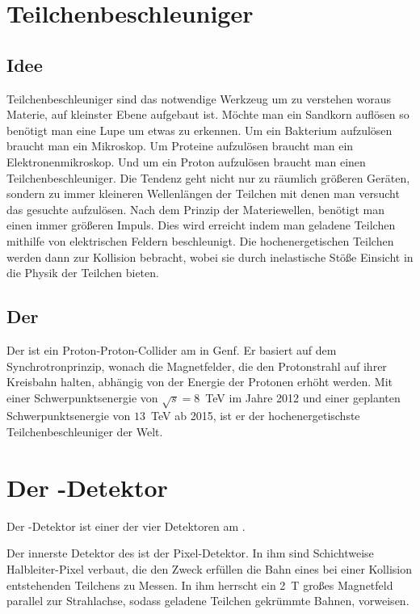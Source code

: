 \section{Teilchenbeschleuniger}
\subsection{Idee}
Teilchenbeschleuniger sind das notwendige Werkzeug um zu verstehen woraus Materie, auf kleinster Ebene aufgebaut ist. Möchte man ein Sandkorn auflösen so benötigt man eine Lupe um etwas zu erkennen. Um ein Bakterium aufzulösen braucht man ein Mikroskop. Um Proteine aufzulösen braucht man ein Elektronenmikroskop. Und um ein Proton aufzulösen braucht man einen Teilchenbeschleuniger. Die Tendenz geht nicht nur zu räumlich größeren Geräten, sondern zu immer kleineren Wellenlängen der Teilchen mit denen man versucht das gesuchte aufzulösen. Nach dem Prinzip der Materiewellen, benötigt man einen immer größeren Impuls. Dies wird erreicht indem man geladene Teilchen mithilfe von elektrischen Feldern beschleunigt. Die hochenergetischen Teilchen werden dann zur Kollision bebracht, wobei sie durch inelastische Stöße Einsicht in die Physik der Teilchen bieten.
\subsection{Der \lhc}
Der \lhc ist ein Proton-Proton-Collider am \cern in Genf. Er basiert auf dem Synchrotronprinzip, wonach die Magnetfelder, die den Protonstrahl auf ihrer Kreisbahn halten, abhängig von der Energie der Protonen erhöht werden. Mit einer Schwerpunktsenergie von $\sqrt{s} = 8$~TeV im Jahre 2012 und einer geplanten Schwerpunktsenergie von $13$~TeV ab 2015, ist er der hochenergetischste Teilchenbeschleuniger der Welt. 
\section{Der \atlas-Detektor}
Der \atlas-Detektor ist einer der vier Detektoren am \lhc. 

Der innerste Detektor des \atlas ist der Pixel-Detektor. In ihm sind Schichtweise Halbleiter-Pixel verbaut, die den Zweck erfüllen die Bahn eines bei einer Kollision entstehenden Teilchens zu Messen. In ihm herrscht ein 2~T großes Magnetfeld parallel zur Strahlachse, sodass geladene Teilchen gekrümmte Bahnen, vorweisen.

